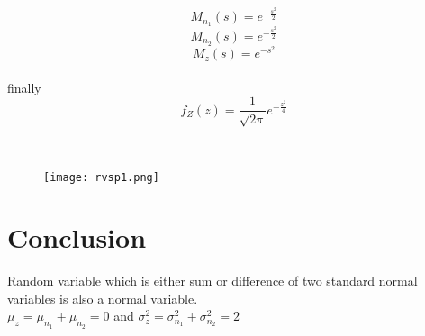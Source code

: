 \documentclass[journal,12pt,twocolumn]{IEEEtran}
\begin{document}
\begin{equation}
    M_{n_1}(s)=e^{-\frac{s^2}{2}}
\end{equation}
\begin{equation}
    M_{n_2}(s)=e^{-\frac{s^2}{2}}
\end{equation}
\begin{equation}
    M_z(s)=e^{-s^2}
\end{equation}\\
finally
\begin{equation}
  f_Z(z)=\frac{1}{\sqrt{2\pi}}e^{-\frac{z^2}{4}}
\end{equation}
 \\

\begin{figure}
    \centering
    \texttt{[image: rvsp1.png]}
\end{figure}
\section{Conclusion}
Random variable which is either sum or difference of two standard normal variables is also a normal variable.\\
$ \mu_z=\mu_{n_1}+\mu_{n_2}=0$ and $\sigma_z^2=\sigma_{n_1}^2+\sigma_{n_2}^2=2$
\end{document}
